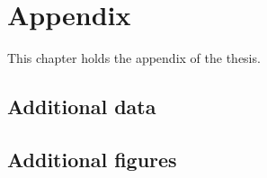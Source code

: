 \chapter{Appendix}

This chapter holds the appendix of the thesis.

\section{Additional data}

\section{Additional figures}